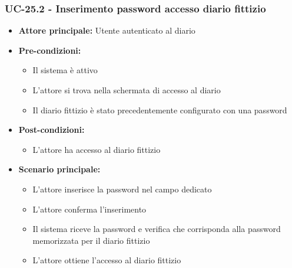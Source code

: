 \documentclass[a4paper,12pt]{article}
\newcommand{\ignoreglossary}{}
\begin{document}
\subsubsection{UC-25.2 - Inserimento password accesso diario fittizio} \label{subsec:UC-25.2}
\begin{itemize}
    \item \textbf{Attore principale:} Utente autenticato al diario
    \item \textbf{Pre-condizioni:}
    \begin{itemize}
        \item Il sistema è attivo
        \item L'attore si trova nella schermata di accesso al diario
        \item Il diario fittizio è stato precedentemente configurato con una password
    \end{itemize}
    \item \textbf{Post-condizioni:} 
    \begin{itemize}
        \item L'attore ha accesso al diario fittizio
    \end{itemize}
    \item \textbf{Scenario principale:} 
    \begin{itemize}
        \item L'attore inserisce la password nel campo dedicato
        \item L'attore conferma l'inserimento
        \item Il sistema riceve la password e \ignoreglossary{verifica} che corrisponda alla password memorizzata per il diario fittizio
        \item L'attore ottiene l'accesso al diario fittizio
    \end{itemize}

\end{itemize}
\end{document}
